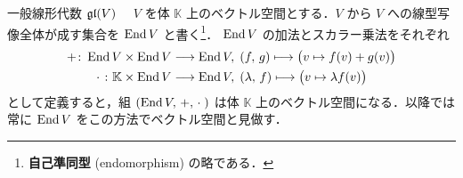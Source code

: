 \documentclass[rep_main]{subfiles}
\begin{document}
\begin{myexample}[label=def:gl-alg]{一般線形代数 $\mathfrak{gl} (V)$}
    　$V$ を体 $\mathbb{K}$ 上のベクトル空間とする．$V$ から $V$ への線型写像全体が成す集合を $\operatorname{End} V$ と書く\footnote{\textbf{自己準同型} (endomorphism) の略である．}．
    $\operatorname{End} V$ の加法とスカラー乗法をそれぞれ
    \begin{align}
        + \colon \operatorname{End} V \times \operatorname{End} V &\longrightarrow \operatorname{End} V,\; (f,\, g) \longmapsto \bigl( v \mapsto f(v) + g(v) \bigr) \\
        \cdot\; \colon \mathbb{K} \times \operatorname{End} V &\longrightarrow \operatorname{End} V,\; (\lambda,\, f) \longmapsto \bigl( v \mapsto \lambda f(v) \bigr)
    \end{align}
    として定義すると，組 $(\operatorname{End} V,\, +,\, \cdot\; )$ は体 $\mathbb{K}$ 上のベクトル空間になる．以降では常に $\operatorname{End} V$ をこの方法でベクトル空間と見做す．


\end{myexample}
\end{document}
